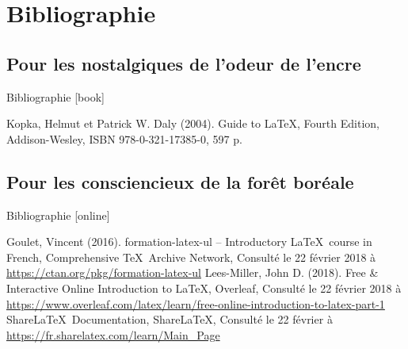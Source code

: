 \scriptsize

\section{Bibliographie}

\subsection{Pour les nostalgiques de l'odeur de l'encre}

\begin{frame}{Bibliographie}
	[book]
		
	\begin{thebibliography}{99}		
			Kopka, Helmut et Patrick W. Daly (2004).
			\newblock Guide to \LaTeX, Fourth Edition,
			\newblock Addison-Wesley,
			\newblock ISBN 978-0-321-17385-0, 597 p.		
	\end{thebibliography}

\end{frame}

\subsection{Pour les consciencieux de la forêt boréale}

\begin{frame}{Bibliographie}
	[online]
	
	\begin{thebibliography}{99}
			Goulet, Vincent (2016).
			\newblock formation-latex-ul -- Introductory \LaTeX\ course in French,
			\newblock Comprehensive \TeX\ Archive Network,
			\newblock Consulté le 22 février 2018 à \href{https://ctan.org/pkg/formation-latex-ul}{%
				https://ctan.org/pkg/formation-latex-ul}
			Lees-Miller, John D. (2018).
			\newblock Free \& Interactive Online Introduction to \LaTeX,
			\newblock Overleaf,
			\newblock Consulté le 22 février 2018 à \href{https://www.overleaf.com/latex/learn/free-online-introduction-to-latex-part-1}{%
				https://www.overleaf.com/latex/learn/free-online-introduction-to-latex-part-1}
			Share\LaTeX\ Documentation,
			\newblock Share\LaTeX,
			\newblock Consulté le 22 février à \href{https://fr.sharelatex.com/learn/Main_Page}{%
				https://fr.sharelatex.com/learn/Main\_Page}			
	\end{thebibliography}
\end{frame}